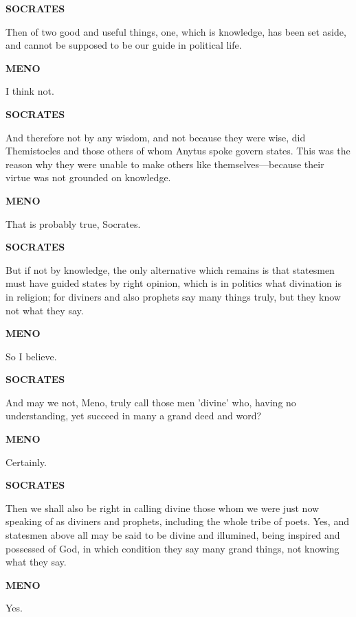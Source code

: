 \documentclass[11pt,letter]{article}
\begin{document}
\par \textbf{SOCRATES}
\par   Then of two good and useful things, one, which is knowledge, has been set aside, and cannot be supposed to be our guide in political life.

\par \textbf{MENO}
\par   I think not.

\par \textbf{SOCRATES}
\par   And therefore not by any wisdom, and not because they were wise, did Themistocles and those others of whom Anytus spoke govern states. This was the reason why they were unable to make others like themselves—because their virtue was not grounded on knowledge.

\par \textbf{MENO}
\par   That is probably true, Socrates.

\par \textbf{SOCRATES}
\par   But if not by knowledge, the only alternative which remains is that statesmen must have guided states by right opinion, which is in politics what divination is in religion; for diviners and also prophets say many things truly, but they know not what they say.

\par \textbf{MENO}
\par   So I believe.

\par \textbf{SOCRATES}
\par   And may we not, Meno, truly call those men 'divine' who, having no understanding, yet succeed in many a grand deed and word?

\par \textbf{MENO}
\par   Certainly.

\par \textbf{SOCRATES}
\par   Then we shall also be right in calling divine those whom we were just now speaking of as diviners and prophets, including the whole tribe of poets. Yes, and statesmen above all may be said to be divine and illumined, being inspired and possessed of God, in which condition they say many grand things, not knowing what they say.

\par \textbf{MENO}
\par   Yes.
\end{document}
